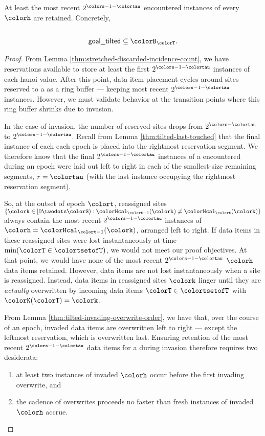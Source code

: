 \begin{lemma}
\label{thm:tilted-most-recent-retained}
At least the most recent $2^{\colors - 1 - \colortau}$ encountered instances of every \hv{} $\colorh$ are retained.
Concretely,
\begin{align*}
\\
\textsf{goal\_tilted} \subseteq \colorB_{\colorT}.
\end{align*}
\end{lemma}
\begin{proof}
From Lemma \ref{thm:stretched-discarded-incidence-count}, we have reservations available to store at least the first $2^{\colors - 1 - \colortau}$ instances of each hanoi value.
After this point, data item placement cycles around sites reserved to a \hv as a ring buffer --- keeping most recent $2^{\colors - 1 - \colortau}$ instances.
However, we must validate behavior at the transition points where this ring buffer shrinks due to invasion.

In the case of invasion, the number of reserved sites drops from $2^{\colors - \colortau}$ to $2^{\colors - 1 - \colortau}$.
Recall from Lemma \ref{thm:tilted-last-touched} that the final instance of each \hv{} each epoch is placed into the rightmost reservation segment.
We therefore know that the final $2^{\colors - 1 - \colortau}$ instances of a \hv{} encountered during an epoch were laid out left to right in each of the smallest-size remaining segments, $r = \colortau$ (with the last instance occupying the rightmost reservation segment).

So, at the outset of epoch $\colort$, reassigned sites $\{\colork \in [0\twodots\colorS) : \colorHcal_{\colort - 1}(\colork) \neq \colorHcal_{\colort}(\colork)\}$ always contain the most recent $2^{\colors - 1 - \colortau}$ instances of \hv{} $\colorh = \colorHcal_{\colort - 1}(\colork)$, arranged left to right.
If data items in these reassigned sites were lost instantaneously at time $\min(\colorT \in \colortsetofT)$, we would not meet our proof objectives.
At that point, we would have none of the most recent $2^{\colors - 1 - \colortau}$ \hv{} $\colorh$ data items retained.
However, data items are not lost instantaneously when a site is reassigned.
Instead, data items in reassigned sites $\colork$ linger until they are \textit{actually} overwritten by incoming data items $\colorT \in \colortsetofT$ with $\colorK(\colorT) = \colork$.

From Lemma \ref{thm:tilted-invading-overwrite-order}, we have that, over the course of an epoch, invaded data items are overwritten left to right --- except the leftmost reservation, which is overwritten last.
Ensuring retention of the most recent $2^{\colors - 1 - \colortau}$ data items for a \hv{} during invasion therefore requires two desiderata:
\begin{enumerate}
\item at least two instances of invaded \hv{} $\colorh$ occur before the first invading overwrite, and
\item the cadence of overwrites proceeds no faster than fresh instances of invaded \hv{} $\colorh$ accrue.
\end{enumerate}



\end{proof}
